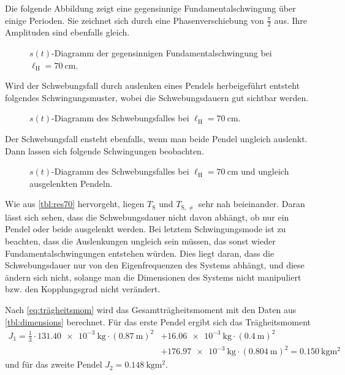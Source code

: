 \documentclass[
12pt,
a4paper,
bibliography=totocnumbered, %
BCOR=1cm, %
oneside, %
]{scrartcl}
\newcommand{\lh}{\ell_{\mathrm{H}}}
\begin{document}
Die folgende Abbildung zeigt eine gegensinnige Fundamentalschwingung über einige Perioden. Sie zeichnet sich durch eine Phasenverschiebung von \(\frac{\pi}{2}\) aus. Ihre Amplituden sind ebenfalls gleich.
\begin{figure}[H]
	\caption{\(s(t)\)-Diagramm der gegensinnigen Fundamentalschwingung bei \(\lh = \qty{70}{\centi\meter}\).}
	\label{fig:geg70}
\end{figure}

Wird der Schwebungsfall durch auslenken eines Pendels herbeigeführt entsteht folgendes Schwingungsmuster, wobei die Schwebungsdauern gut sichtbar werden.
\begin{figure}[H]
	\caption{\(s(t)\)-Diagramm des Schwebungsfalles bei \(\lh = \qty{70}{\centi\meter}\).}
	\label{fig:schweb}
\end{figure}

Der Schwebungsfall ensteht ebenfalls, wenn man beide Pendel ungleich auslenkt. Dann lassen sich folgende Schwingungen beobachten.
\begin{figure}[H]
	\caption{\(s(t)\)-Diagramm des Schwebungsfalles bei \(\lh = \qty{70}{\centi\meter}\) und ungleich ausgelenkten Pendeln.}
	\label{fig:ungl70}
\end{figure}

Wie aus \autoref{tbl:res70} hervorgeht, liegen \(T_{\text{S}}\) und \(T_{\text{S},≠}\) sehr nah beieinander. Daran lässt sich sehen, dass die Schwebungsdauer nicht davon abhängt, ob nur ein Pendel oder beide ausgelenkt werden. Bei letztem Schwingungsmode ist zu beachten, dass die Auslenkungen ungleich sein müssen, das sonst wieder Fundamentalschwingungen entstehen würden. Dies liegt daran, dass die Schwebungsdauer nur von den Eigenfrequenzen des Systems abhängt, und diese ändern sich nicht, solange man die Dimensionen des Systems nicht manipuliert bzw. den Kopplungsgrad nicht verändert.

Nach \autoref{eq:trägheitsmom} wird das Gesamtträgheitsmoment mit den Daten aus \autoref{tbl:dimensions} berechnet. Für das erste Pendel ergibt sich das Trägheitsmoment
\begin{equation*}
	\begin{split}
		J_1 = \frac{1}{3} \cdot \qty{131,40e-3}{\kilogram} \cdot (\qty{0,87}{\meter})^2 &+ \qty{16,06e-3}{\kilogram} \cdot (\qty{0,4}{\meter})^2
		\\&+ \qty{176,97e-3}{\kilogram} \cdot (\qty{0,804}{\meter})^2 = \qty{0,150}{\kilogram\meter\squared}
	\end{split}
\end{equation*}
und für das zweite Pendel \(J_2 = \qty{0,148}{\kilogram\meter\squared}\).
\end{document}
